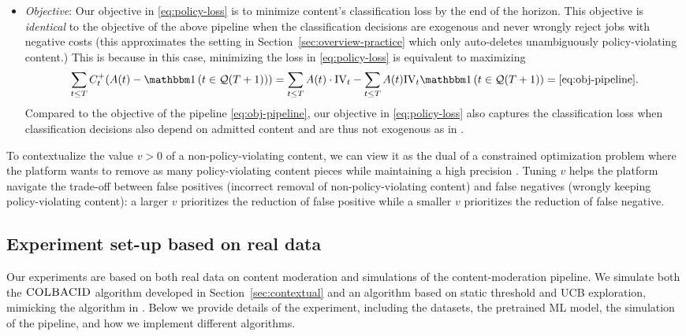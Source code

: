 \begin{itemize}
\item \emph{Objective}: Our objective in \eqref{eq:policy-loss} is to minimize content's classification loss by the end of the horizon. This objective is \emph{identical} to the objective of the above pipeline when the classification decisions are exogenous and never wrongly reject jobs with negative costs (this approximates the setting in Section~\ref{sec:overview-practice} which only auto-deletes unambiguously policy-violating content.) This is because in this case, minimizing the loss in \eqref{eq:policy-loss} is equivalent to maximizing 
\[
\sum_{t \leq T} C^+_t (A(t) - \indic{t \in \set{Q}(T+1)}) = \sum_{t \leq T} A(t) \cdot \text{IV}_t  - \sum_{t \leq T} A(t)\text{IV}_t \indic{t \in \set{Q}(T+1)} = \eqref{eq:obj-pipeline}.
\]
Compared to the objective of the pipeline \eqref{eq:obj-pipeline}, our objective in \eqref{eq:policy-loss} also captures the classification loss when classification decisions also depend on admitted content and are thus not exogenous as in \cite{Avadhanula2022}.
\end{itemize}
\begin{remark}\label{remark:value}
To contextualize the value $v > 0$ of a non-policy-violating content, we can view it as the dual of a constrained optimization problem where the platform wants to remove as many policy-violating content pieces while maintaining a high precision \citep{linkedin}. Tuning $v$ helps the platform navigate the trade-off between false positives (incorrect removal of non-policy-violating content) and false negatives (wrongly keeping policy-violating content): a larger $v$ prioritizes the reduction of false positive while a smaller $v$ prioritizes the reduction of false negative. 
\end{remark}

\subsection{Experiment set-up based on real data} \label{sec:set-up}
Our experiments are based on both real data on content moderation and simulations of the content-moderation pipeline. We simulate both the $\textsc{COLBACID}$ algorithm developed in Section~\ref{sec:contextual} and an algorithm based on static threshold and UCB exploration, mimicking the algorithm in \cite{Avadhanula2022}. Below we provide details of the experiment, including the datasets, the pretrained ML model, the simulation of the pipeline, and how we implement different algorithms.

